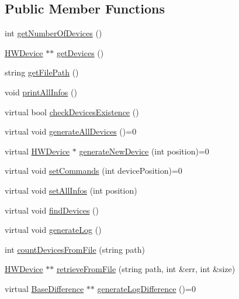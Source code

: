 \subsection*{Public Member Functions}
\begin{DoxyCompactItemize}
\item 
int \hyperlink{classDeviceManager_ab0e75c9472f3213243f5be200cf8a459}{get\+Number\+Of\+Devices} ()
\item 
\hyperlink{classHWDevice}{H\+W\+Device} $\ast$$\ast$ \hyperlink{classDeviceManager_a6d01b46c8522dc3d5a7cefbab539a21d}{get\+Devices} ()
\item 
string \hyperlink{classDeviceManager_aebc35de93caa9623ac28166f463494fb}{get\+File\+Path} ()
\item 
void \hyperlink{classDeviceManager_ac5ebb7ae4c669b43e96f2c533880c2a2}{print\+All\+Infos} ()
\item 
virtual bool \hyperlink{classDeviceManager_af9949548d51650ab8ac223d32559f8f0}{check\+Devices\+Existence} ()
\item 
virtual void \hyperlink{classDeviceManager_ae9fa3bd3aa66f373d7748628b7ba26cc}{generate\+All\+Devices} ()=0
\item 
virtual \hyperlink{classHWDevice}{H\+W\+Device} $\ast$ \hyperlink{classDeviceManager_a64c7c17d8cb8d407361dbcf8f6f17ccf}{generate\+New\+Device} (int position)=0
\item 
virtual void \hyperlink{classDeviceManager_ae367c6847b2988cf6249cbf6254261cb}{set\+Commands} (int device\+Position)=0
\item 
virtual void \hyperlink{classDeviceManager_a4c34a8b9035b29829739c533b611ab07}{set\+All\+Infos} (int position)
\item 
virtual void \hyperlink{classDeviceManager_a17458750431e2131c06e58e8b82a90d1}{find\+Devices} ()
\item 
virtual void \hyperlink{classDeviceManager_a0bbabbb33adf1eb6eee22ac78d1da7b7}{generate\+Log} ()
\item 
int \hyperlink{classDeviceManager_a7e7bcbfe9ad42a5986d354352b80d917}{count\+Devices\+From\+File} (string path)
\item 
\hyperlink{classHWDevice}{H\+W\+Device} $\ast$$\ast$ \hyperlink{classDeviceManager_a8c9576d042fb3a949c7658bb514a54ae}{retrieve\+From\+File} (string path, int \&err, int \&size)
\item 
virtual \hyperlink{classBaseDifference}{Base\+Difference} $\ast$$\ast$ \hyperlink{classDeviceManager_ae9916011e50a6a48aea3d87b6c44b27e}{generate\+Log\+Difference} ()=0
\item 
$$
\end{DoxyCompactItemize}
